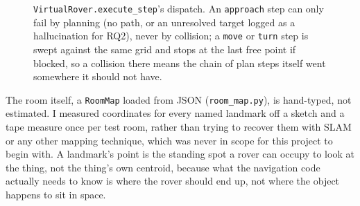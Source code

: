 \begin{figure}[htbp]
  \centering
  \caption{\texttt{VirtualRover.execute\_step}'s dispatch. An \texttt{approach} step can only fail by planning (no path, or an unresolved target logged as a hallucination for RQ2), never by collision; a \texttt{move} or \texttt{turn} step is swept against the same grid and stops at the last free point if blocked, so a collision there means the chain of plan steps itself went somewhere it should not have.}
  \label{fig:flow-virtualrover}
\end{figure}

The room itself, a \texttt{RoomMap} loaded from JSON
(\texttt{room\_map.py}), is hand-typed, not estimated. I measured
coordinates for every named landmark off a sketch and a tape measure once
per test room, rather than trying to recover them with SLAM or any other
mapping technique, which was never in scope for this project to begin
with. A landmark's point is the standing spot a rover can occupy to look
at the thing, not the thing's own centroid, because what the navigation
code actually needs to know is where the rover should end up, not where
the object happens to sit in space.

